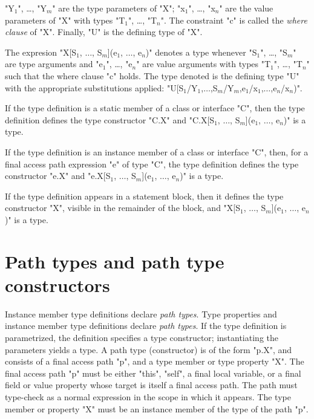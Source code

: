 \xcdmath"Y$_1$", \dots, \xcdmath"Y$_m$"
are the type parameters of \xcd"X";
\xcdmath"x$_1$", \dots, \xcdmath"x$_n$"
are the value parameters of \xcd"X" with types
\xcdmath"T$_1$", \dots, \xcdmath"T$_n$".
The constraint \xcd"c" is called the \emph{where clause} of
\xcd"X".  Finally, \xcd"U" is the defining type of \xcd"X".
\label{TypeDefWhereClause}

The expresion \xcdmath"X[S$_1$, $\dots$, S$_m$](e$_1$, $\dots$, e$_n$)"
denotes a type whenever 
\xcdmath"S$_1$", \dots, \xcdmath"S$_m$" are type arguments and 
\xcdmath"e$_1$", \dots, \xcdmath"e$_n$" are value arguments with
types \xcdmath"T$_1$", \dots, \xcdmath"T$_n$"
such that the where clause \xcd"c" holds. The type denoted is
the defining type \xcd"U" with the appropriate substitutions applied:
\xcdmath"U[S$_1$/Y$_1$,$\dots$,S$_m$/Y$_m$,e$_1$/x$_1$,$\dots$,e$_n$/x$_n$)".

        If the type definition 
        is a static member of a class or
        interface \xcd"C", then the type definition
        defines the type constructor \xcd"C.X"
and
\xcdmath"C.X[S$_1$, $\dots$, S$_m$](e$_1$, $\dots$, e$_n$)"
is a type.

        If the type definition 
        is an instance member of a class or
        interface \xcd"C", then, for a final access path expression \xcd"e" of type \xcd"C",
        the type definition
        defines the type constructor \xcd"e.X"
and
\xcdmath"e.X[S$_1$, $\dots$, S$_m$](e$_1$, $\dots$, e$_n$)"
is a type.

        If the type definition 
        appears in a statement block, then it
        defines the type constructor \xcd"X", visible in the
        remainder of the block,
and
\xcdmath"X[S$_1$, $\dots$, S$_m$](e$_1$, $\dots$, e$_n$)"
is a type.

\section{Path types and path type constructors}


\iftypeparams
Instance member type definitions declare \emph{path types}.
\else
Type properties and
instance member type definitions 
declare \emph{path types}.
\fi
If the type definition is parametrized, the definition specifies
a type constructor; instantiating the parameters yields a type.
A path type (constructor)
is of the form \xcd"p.X", and consists of a final access path
\xcd"p", and a type
member
\iftypeparams\else
or type property
\fi
\xcd"X".
The final access path \xcd"p" must be either \xcd"this", \xcd"self", a final
local variable, or a final field or value property whose target
is itself a final access path.  The path must type-check 
as a normal expression in the scope in which it appears.
The type member
\iftypeparams
or property
\fi
\xcd"X" must be an instance member of the type of the
path \xcd"p".

